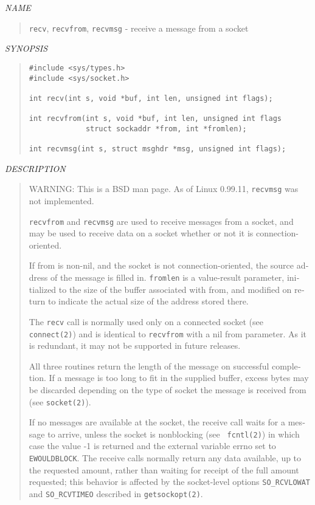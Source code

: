 \begin{appendix}
\begin{english}
{\sl NAME}
\begin{quote}
 	{\tt recv}, {\tt recvfrom}, {\tt recvmsg} - receive a message from a
socket
\end{quote}

{\sl SYNOPSIS}
\begin{quote}
\begin{verbatim}
#include <sys/types.h>
#include <sys/socket.h>

int recv(int s, void *buf, int len, unsigned int flags);

int recvfrom(int s, void *buf, int len, unsigned int flags
             struct sockaddr *from, int *fromlen);

int recvmsg(int s, struct msghdr *msg, unsigned int flags);
\end{verbatim}
\end{quote}

{\sl DESCRIPTION}
\begin{quote}
	WARNING: This is a BSD man page. As of Linux 0.99.11, {\tt recvmsg}
	was not implemented.

	{\tt recvfrom} and {\tt recvmsg} are used to receive messages from a
	socket, and may be used to receive data on a socket whether or not
	it is connection-oriented.

	If from is non-nil, and the socket is not connection-oriented, the
	source address of the message is filled in. {\tt fromlen} is a
	value-result parameter, initialized to the size of the buffer
	associated with from, and modified on return to indicate the actual
	size of the address stored there.

	The {\tt recv} call is normally used only on a connected socket (see
	{\tt connect(2)}) and is identical to {\tt recvfrom} with a nil from
	parameter. As it is redundant, it may not be supported in future
	releases.

	All three routines return the length of the message on successful
	completion. If a message is too long to fit in the supplied buffer,
	excess bytes may be discarded depending on the type of socket the
	message is received from (see {\tt socket(2)}).

	If no messages are available at the socket, the receive call waits
	for a message to arrive, unless the socket is nonblocking (see {\tt
	fcntl(2)}) in which case the value -1 is returned and the external
	variable errno set to {\tt EWOULDBLOCK}. The receive calls normally
	return any data available, up to the requested amount, rather than
	waiting for receipt of the full amount requested; this behavior is
	affected by the socket-level options {\tt SO\_RCVLOWAT} and {\tt SO\_RCVTIMEO}
	described in {\tt getsockopt(2)}.


\end{quote}
\end{english}
\end{appendix}
